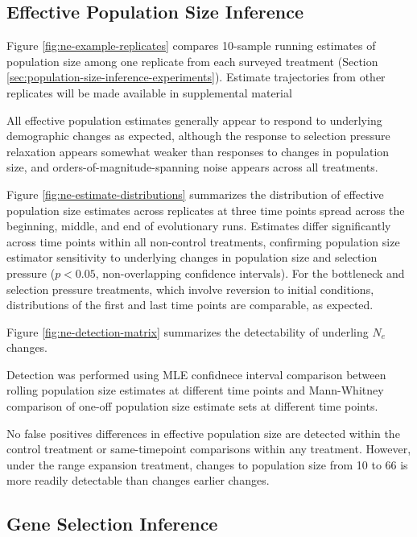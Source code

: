 \subsection{Effective Population Size Inference}



Figure \ref{fig:ne-example-replicates} compares 10-sample running estimates of population size among one replicate from each surveyed treatment (Section \ref{sec:population-size-inference-experiments}).
Estimate trajectories from other replicates will be made available in supplemental material

All effective population estimates generally appear to respond to underlying demographic changes as expected, although the response to selection pressure relaxation appears somewhat weaker than responses to changes in population size, and orders-of-magnitude-spanning noise appears across all treatments.



Figure \ref{fig:ne-estimate-distributions} summarizes the distribution of effective population size estimates across replicates at three time points spread across the beginning, middle, and end of evolutionary runs.
Estimates differ significantly across time points within all non-control treatments, confirming population size estimator sensitivity to underlying changes in population size and selection pressure ($p < 0.05$, non-overlapping confidence intervals).
For the bottleneck and selection pressure treatments, which involve reversion to initial conditions, distributions of the first and last time points are comparable, as expected.



Figure \ref{fig:ne-detection-matrix} summarizes the detectability of underling $N_e$ changes.

Detection was performed using MLE confidnece interval comparison between rolling population size estimates at different time points and Mann-Whitney comparison of one-off population size estimate sets at different time points.

No false positives differences in effective population size are detected within the control treatment or same-timepoint comparisons within any treatment.
However, under the range expansion treatment, changes to population size from 10 to 66 is more readily detectable than changes earlier changes.




\subsection{Gene Selection Inference}



